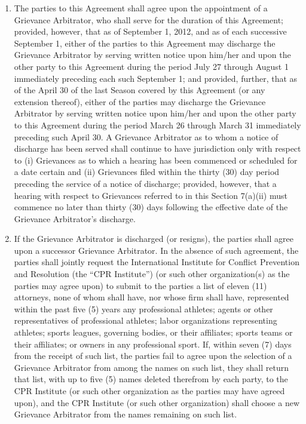 \documentclass[
]{book}
\providecommand{\tightlist}{%
  \setlength{\itemsep}{0pt}\setlength{\parskip}{0pt}}
\begin{document}
\begin{enumerate}
\def\labelenumi{(\alph{enumi})}
\tightlist
\item
  The parties to this Agreement shall agree upon the appointment of a Grievance Arbitrator, who shall serve for the duration of this Agreement; provided, however, that as of September 1, 2012, and as of each successive September 1, either of the parties to this Agreement may discharge the Grievance Arbitrator by serving written notice upon him/her and upon the other party to this Agreement during the period July 27 through August 1 immediately preceding each such September 1; and provided, further, that as of the April 30 of the last Season covered by this Agreement (or any extension thereof), either of the parties may discharge the Grievance Arbitrator by serving written notice upon him/her and upon the other party to this Agreement during the period March 26 through March 31 immediately preceding such April 30. A Grievance Arbitrator as to whom a notice of discharge has been served shall continue to have jurisdiction only with respect to (i) Grievances as to which a hearing has been commenced or scheduled for a date certain and (ii) Grievances filed within the thirty (30) day period preceding the service of a notice of discharge; provided, however, that a hearing with respect to Grievances referred to in this Section 7(a)(ii) must commence no later than thirty (30) days following the effective date of the Grievance Arbitrator's discharge.
\item
  If the Grievance Arbitrator is discharged (or resigns), the parties shall agree upon a successor Grievance Arbitrator. In the absence of such agreement, the parties shall jointly request the International Institute for Conflict Prevention and Resolution (the ``CPR Institute'') (or such other organization(s) as the parties may agree upon) to submit to the parties a list of eleven (11) attorneys, none of whom shall have, nor whose firm shall have, represented within the past five (5) years any professional athletes; agents or other representatives of professional athletes; labor organizations representing athletes; sports leagues, governing bodies, or their affiliates; sports teams or their affiliates; or owners in any professional sport. If, within seven (7) days from the receipt of such list, the parties fail to agree upon the selection of a Grievance Arbitrator from among the names on such list, they shall return that list, with up to five (5) names deleted therefrom by each party, to the CPR Institute (or such other organization as the parties may have agreed upon), and the CPR Institute (or such other organization) shall choose a new Grievance Arbitrator from the names remaining on such list.
\end{enumerate}
\end{document}
